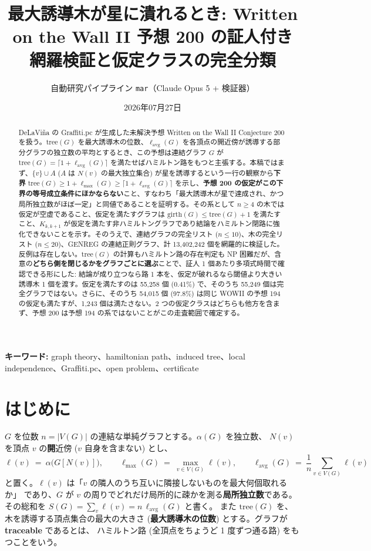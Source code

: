 \documentclass[paper=a4,fontsize=10.5pt,jafontsize=10.5pt]{jlreq}
\title{最大誘導木が星に潰れるとき: Written on the Wall II 予想 200 の証人付き網羅検証と仮定クラスの完全分類}
\author{自動研究パイプライン \texttt{mar}（Claude Opus 5 + 検証器）}
\date{2026年07月27日}
\theoremstyle{plain}
\theoremstyle{definition}
\begin{document}
\maketitle

\begin{abstract}
DeLaViña の Graffiti.pc が生成した未解決予想 Written on the Wall II Conjecture 200 を扱う。$\mathrm{tree}(G)$ を最大誘導木の位数、$\ell_{\mathrm{avg}}(G)$ を各頂点の開近傍が誘導する部分グラフの独立数の平均とするとき、この予想は連結グラフ $G$ が $\mathrm{tree}(G) = \lceil 1 + \ell_{\mathrm{avg}}(G)\rceil$ を満たせばハミルトン路をもつと主張する。本稿ではまず、$\{v\} \cup A$ ($A$ は $N(v)$ の最大独立集合) が星を誘導するという一行の観察から\textbf{下界} $\mathrm{tree}(G) \ge 1 + \ell_{\max}(G) \ge \lceil 1 + \ell_{\mathrm{avg}}(G)\rceil$ を示し、\textbf{予想 200 の仮定がこの下界の等号成立条件にほかならない}こと、すなわち「最大誘導木が星で達成され、かつ局所独立数がほぼ一定」と同値であることを証明する。その系として $n \ge 4$ の木では仮定が空虚であること、仮定を満たすグラフは $\mathrm{girth}(G) \le \mathrm{tree}(G) + 1$ を満たすこと、$K_{k,k+1}$ が仮定を満たす非ハミルトングラフであり結論をハミルトン閉路に強化できないことを示す。そのうえで、連結グラフの完全リスト ($n \le 10$)、木の完全リスト ($n \le 20$)、GENREG の連結正則グラフ、計 13,402,242 個を網羅的に検証した。反例は存在しない。$\mathrm{tree}(G)$ の計算もハミルトン路の存在判定も NP 困難だが、含意の\textbf{どちら側を閉じるかをグラフごとに選ぶ}ことで、証人 1 個あたり多項式時間で確認できる形にした: 結論が成り立つなら路 1 本を、仮定が破れるなら閾値より大きい誘導木 1 個を渡す。仮定を満たすのは 55,258 個 (0.41\%) で、そのうち 55,249 個は完全グラフではない。さらに、そのうち 54,015 個 (97.8\%) は同じ WOWII の予想 194 の仮定も満たすが、1,243 個は満たさない。2 つの仮定クラスはどちらも他方を含まず、予想 200 は予想 194 の系ではないことがこの走査範囲で確定する。
\end{abstract}

\noindent\textbf{キーワード:} graph theory、hamiltonian path、induced tree、local independence、Graffiti.pc、open problem、certificate


\section{はじめに}

$G$ を位数 $n = |V(G)|$ の連結な単純グラフとする。$\alpha(G)$ を独立数、
$N(v)$ を頂点 $v$ の\textbf{開}近傍 ($v$ 自身を含まない) とし、
\[ \ell(v) \ = \ \alpha\bigl(G[N(v)]\bigr), \qquad
   \ell_{\max}(G) \ = \ \max_{v \in V(G)} \ell(v), \qquad
   \ell_{\mathrm{avg}}(G) \ = \ \frac{1}{n} \sum_{v \in V(G)} \ell(v) \]
と置く。$\ell(v)$ は「$v$ の隣人のうち互いに隣接しないものを最大何個取れるか」
であり、$G$ が $v$ の周りでどれだけ局所的に疎かを測る\textbf{局所独立数}である。
その総和を $S(G) = \sum_v \ell(v) = n\,\ell_{\mathrm{avg}}(G)$ と書く。
また $\mathrm{tree}(G)$ を、木を誘導する頂点集合の最大の大きさ
(\textbf{最大誘導木の位数}) とする。グラフが \textbf{traceable} であるとは、
ハミルトン路 (全頂点をちょうど 1 度ずつ通る路) をもつことをいう。
\end{document}
